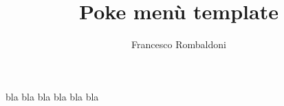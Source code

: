 \documentclass[hidelinks,12pt,a4paper]{article}
\begin{document}
	
	
	\pagestyle{empty}
	
	\title{\textbf{Poke menù template}}
	\author{Francesco Rombaldoni}
	\date{}
	
	\maketitle
	
	\newpage
	\begin{landscape}
	bla bla bla 
	\newpage
	bla bla bla
	\end{landscape}
	\newpage
	\vspace*{\fill}
	\begin{center}
		\begin{minipage}{0.8\linewidth}
			\doclicenseThis
		\end{minipage}
	\end{center}
	
\end{document}
